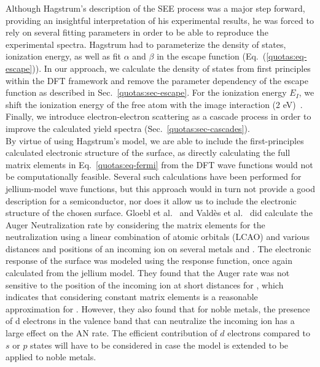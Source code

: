 \begin{refsection}
Although Hagstrum's description of the SEE process was a major step forward, 
providing an insightful interpretation of his experimental results, he was 
forced to rely on several fitting parameters in order to be able to reproduce 
the experimental spectra. Hagstrum had to parameterize the density of states, 
ionization energy, as well as fit $\alpha$ and $\beta$ in the escape function 
(Eq.~(\ref{quotas:eq-escape})). In our approach, we calculate the density of 
states from first principles within the DFT framework and remove the parameter 
dependency of the escape function as described in 
Sec.~\ref{quotas:sec-escape}. For the ionization energy $E_I$, we shift the 
ionization energy of the free atom with the image interaction (2 
\si{\electronvolt})~\cite{Baragiola1996, Riccardi2003}. Finally, we introduce 
electron-electron scattering as a cascade process in order to improve the 
calculated yield spectra (Sec.~\ref{quotas:sec-cascades}).\\ 
 
By virtue of using Hagstrum's model, we are able to include the 
first-principles calculated electronic structure of the surface, as directly 
calculating the full matrix elements in Eq.~\ref{quotas:eq-fermi} from the DFT 
wave functions would not be computationally feasible. Several such 
calculations have been performed for jellium-model wave functions, but this 
approach would in turn not provide a good description for a semiconductor, nor 
does it allow us to include the electronic structure of the chosen surface. 
Gloebl et al.~\cite{Goebl2011, Goebl2013} and Vald\`es et 
al.~\cite{Valdes2006} did calculate the Auger Neutralization rate by 
considering the matrix elements for the neutralization using a linear 
combination of atomic orbitals (LCAO) and various distances and positions of 
an incoming  ion on several metals and . The electronic 
response of the surface was modeled using the response function, once again 
calculated from the jellium model. They found that the Auger rate was not 
sensitive to the position of the incoming ion at short distances for , 
which indicates that considering constant matrix elements is a reasonable 
approximation for . However, they also found that for noble metals, the 
presence of d electrons in the valence band that can neutralize the incoming 
ion has a large effect on the AN rate. The efficient contribution of $d$ 
electrons compared to $s$ or $p$ states will have to be considered in case the 
model is extended to be applied to noble metals. 
 

\end{refsection}

